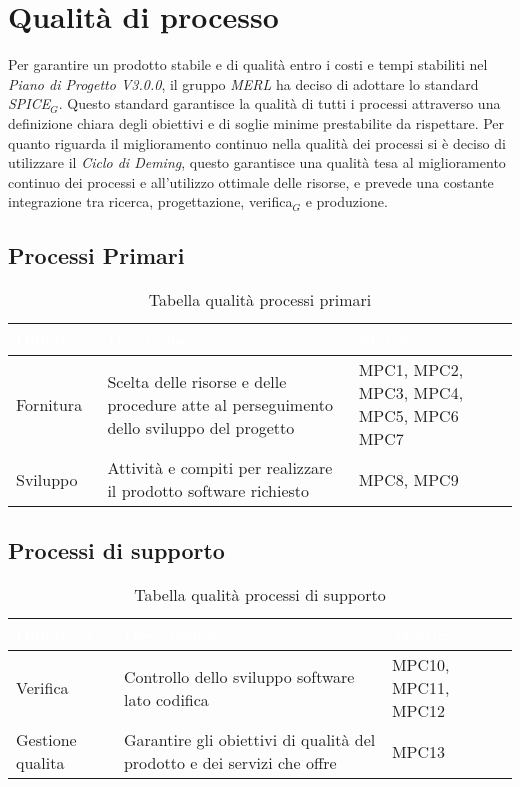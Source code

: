 \chapter{Qualità di processo}
Per garantire un prodotto stabile e di qualità entro i costi e tempi stabiliti nel \textit{Piano di Progetto V3.0.0}, il gruppo \textit{MERL} ha deciso di adottare lo standard \textit{SPICE}$_G$. Questo standard garantisce la qualità di tutti i processi attraverso una definizione chiara degli obiettivi e di soglie minime prestabilite da rispettare.
Per quanto riguarda il miglioramento continuo nella qualità dei processi si è deciso di utilizzare il \textit{Ciclo di Deming}, questo garantisce una qualità tesa al miglioramento continuo dei processi e all'utilizzo ottimale delle risorse, e prevede una costante integrazione tra ricerca, progettazione, verifica$_G$ e produzione.

\section{Processi Primari}
\begin{table}[H]
  \renewcommand{\arraystretch}{1.25}
  \begin{tabular}{|p{2.5cm}|p{8cm}|p{3cm}|} \hline
    \rowcolor[HTML]{036400}
    \textcolor{white}{\textbf{Obiettivo}} & \textcolor{white}{\textbf{Descrizione}} & \textcolor{white}{\textbf{Metrica}}  \\ \hline
    \rowcolor[HTML]{EFEFEF}
    Fornitura & Scelta delle risorse e delle procedure atte al perseguimento dello sviluppo del progetto & MPC1, MPC2, \newline MPC3, MPC4, \newline MPC5, MPC6 \newline MPC7     \\ \hline
    \rowcolor[HTML]{C0C0C0}
    Sviluppo & Attività e compiti per realizzare il prodotto software richiesto & MPC8, MPC9 \\ \hline
  \end{tabular}
  \caption{Tabella qualità processi primari}
\end{table}


\section{Processi di supporto}
\begin{table}[H]
  \renewcommand{\arraystretch}{1.25}
  \begin{tabular}{|p{2.5cm}|p{8cm}|p{1.7cm}|} \hline
    \rowcolor[HTML]{036400}
    \textcolor{white}{\textbf{Obiettivo}} & \textcolor{white}{\textbf{Descrizione}} & \textcolor{white}{\textbf{Metrica}}  \\ \hline
    \rowcolor[HTML]{EFEFEF}
    Verifica & Controllo dello sviluppo software lato codifica & MPC10, MPC11, MPC12  \\ \hline
    \rowcolor[HTML]{C0C0C0}
    Gestione qualita & Garantire gli obiettivi di qualità del prodotto e dei servizi che offre & MPC13  \\ \hline
  \end{tabular}
  \caption{Tabella qualità processi di supporto}
\end{table}


